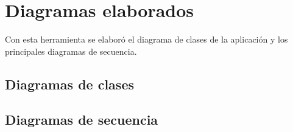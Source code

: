 \section{Diagramas elaborados}
Con esta herramienta se elaboró el diagrama de clases de la aplicación y los
principales diagramas de secuencia.

\subsection{Diagramas de clases}

\subsection{Diagramas de secuencia}


